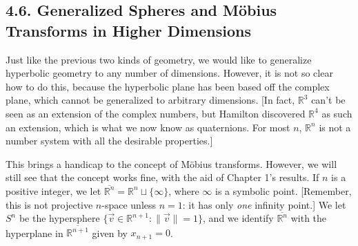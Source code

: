 \documentclass[leqno]{book}
\begin{document}
\subsection*{4.6. Generalized Spheres and M\"obius Transforms in Higher Dimensions}
Just like the previous two kinds of geometry, we would like to generalize hyperbolic geometry to any number of dimensions.  However, it is not so clear how to do this, because the hyperbolic plane has been based off the complex plane, which cannot be generalized to arbitrary dimensions.  [In fact, $\mathbb R^3$ can't be seen as an extension of the complex numbers, but Hamilton discovered $\mathbb R^4$ as such an extension, which is what we now know as quaternions.  For most $n$, $\mathbb R^n$ is not a number system with all the desirable properties.] %

This brings a handicap to the concept of M\"obius transforms.  However, we will still see that the concept works fine, with the aid of Chapter 1's results.  If $n$ is a positive integer, we let $\overline{\mathbb R^n}=\mathbb R^n\sqcup\{\infty\}$, where $\infty$ is a symbolic point.  [Remember, this is not projective $n$-space unless $n=1$: it has only \emph{one} infinity point.]  We let $S^n$ be the hypersphere $\{\vec v\in\mathbb R^{n+1}:\|\vec v\|=1\}$, and we identify $\overline{\mathbb R^n}$ with the hyperplane in $\overline{\mathbb R^{n+1}}$ given by $x_{n+1}=0$.
\end{document}
